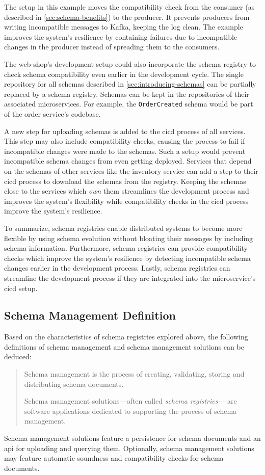 The setup in this example moves the compatibility check from the consumer (as described in \ref{sec:schema-benefits}) to the producer.
It prevents producers from writing incompatible messages to Kafka, keeping the log clean.
The example improves the system's resilience by containing failures due to incompatible changes in the producer instead of spreading them to the consumers.

The web-shop's development setup could also incorporate the schema registry to check schema compatibility even earlier in the development cycle.
The single repository for all schemas described in \ref{sec:introducing-schemas} can be partially replaced by a schema registry.
Schemas can be kept in the repositories of their associated microservices.
For example, the \texttt{OrderCreated} schema would be part of the order service's codebase.

A new step for uploading schemas is added to the \gls{cicd} process of all services.
This step may also include compatibility checks, causing the process to fail if incompatible changes were made to the schemas.
Such a setup would prevent incompatible schema changes from even getting deployed.
Services that depend on the schemas of other services like the inventory service can add a step to their \gls{cicd} process to download the schemas from the registry.
Keeping the schemas close to the services which \emph{own} them streamlines the development process and improves the system's flexibility while compatibility checks in the \gls{cicd} process improve the system's resilience.

To summarize, schema registries enable distributed systems to become more flexible by using schema evolution without bloating their messages by including schema information.
Furthermore, schema registries can provide compatibility checks which improve the system's resilience by detecting incompatible schema changes earlier in the development process.
Lastly, schema registries can streamline the development process if they are integrated into the microservice's \gls{cicd} setup.

\subsection{Schema Management Definition}

Based on the characteristics of schema registries explored above, the following definitions of schema management and schema management solutions can be deduced:

\begin{quote}
  \centering
  Schema management is the process of creating, validating, storing and distributing schema documents.

  Schema management solutions---often called \emph{schema registries}--- are software applications dedicated to supporting the process of schema management.
\end{quote}

Schema management solutions feature a persistence for schema documents and an \gls{api} for uploading and querying them.
Optionally, schema management solutions may feature automatic soundness and compatibility checks for schema documents.
